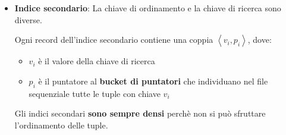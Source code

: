 \documentclass[a4paper,twoside]{article}
\begin{document}
\begin{itemize}
\begin{itemize}
\begin{itemize}
\begin{itemize}
              \item Se l'indice è \textbf{sparso} l'inserimento avviene solo quando,
                per effetto dell'inserimento di una nuova tupla, si aggiunge un blocco
                dati alla struttura; in tutti gli altri casi l'indice rimane invariato
            \end{itemize}
            Gli indici sono costosi, quindi bisogna fare un compromesso sul numero di indici
            da mantenere e il numero di attributi ad accesso sequenziale.

          \item \textbf{Cancellazione} di un record nell'indice. Si effettuano gli stessi
            passi della cancellazione in un file sequenziale
            (\ref{item:cancellazione_ordinata}).

            \begin{itemize}
              \item Se l'indice è \textbf{denso} la cancellazione nell'indice avviene
                solo se la tupla cancellata nel file è l’ultima tupla con valore di
                chiave \( K \)  

              \item Se l'indice è \textbf{sparso} la cancellazione nell'indice avviene
                solo quando \( K \) è presente nell'indice e il corrispondente blocco
                viene eliminato; altrimenti, se il blocco sopravvive, va sostituito
                \( K \) nel record dell'indice con il primo valore \( K' \) presente
                nel blocco.
            \end{itemize}
        \end{itemize}
    \end{itemize}

  \item \textbf{Indice secondario}: La chiave di ordinamento e la chiave di ricerca
    sono diverse.

    Ogni record dell'indice secondario contiene una coppia \( \left<v_i, p_i \right> \),
    dove:
    \begin{itemize}
      \item \( v_i \) è il valore della chiave di ricerca
      \item \( p_i \) è il puntatore al \textbf{bucket di puntatori} che individuano
        nel file sequenziale tutte le tuple con chiave \( v_i \)
    \end{itemize}
    Gli indici secondari \textbf{sono sempre densi} perchè non si può sfruttare
    l'ordinamento delle tuple.


\end{itemize}
\end{document}
